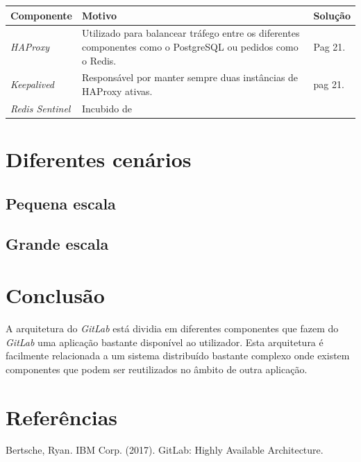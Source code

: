 \documentclass[12pt,a4paper]{article}
\begin{document}
\begin{center}
    \small
    \begin{tabular}{ | l | p{6cm} | p{6cm} |}
    \hline
    \textbf{Componente} & \textbf{Motivo} & \textbf{Solução} \\ \hline
    \textit{HAProxy} & Utilizado para balancear tráfego entre os diferentes componentes como o PostgreSQL ou pedidos como o Redis. & Pag 21. \\ \hline
    \textit{Keepalived} &Responsável por manter sempre duas instâncias de HAProxy ativas. & pag 21. \\
    \hline
    \textit{Redis Sentinel} & Incubido de 
    \end{tabular}
\end{center}



\section{Diferentes cenários}
\subsection{Pequena escala}
\subsection{Grande escala}




\newpage
\section{Conclusão}

A arquitetura do \emph{GitLab} está dividia em diferentes componentes que fazem do \emph{GitLab} uma aplicação bastante disponível ao utilizador. Esta arquitetura é facilmente relacionada a um sistema distribuído bastante complexo onde existem componentes que podem ser reutilizados no âmbito de outra aplicação.

\newpage
\section{Referências}

\vspace{1.3cm}
Bertsche, Ryan. IBM Corp. (2017). GitLab: Highly Available Architecture.
\end{document}
